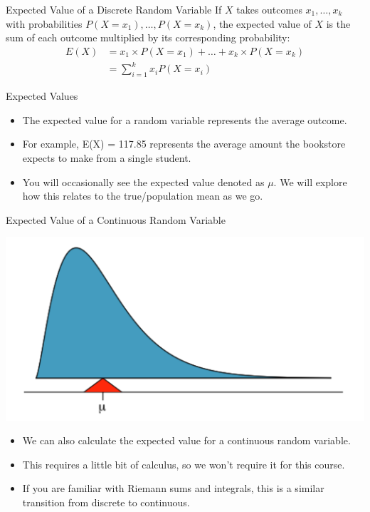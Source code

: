 \begin{frame}{Expected Value of a Discrete Random Variable}
    If $X$ takes outcomes $x_1, \dots, x_k$ with probabilities $P(X = x_1), \dots, P(X = x_k)$, the expected value of $X$ is the sum of each outcome multiplied by its corresponding probability:
    \begin{align*}
        E(X)&=x_1 \times P(X =x_1)+\dots +x_k ×P(X =x_k) \\
        &= \sum_{i=1}^k x_i P(X=x_i)
    \end{align*}
\end{frame}

\begin{frame}{Expected Values}
    \begin{itemize}
        \item The expected value for a random variable represents the average outcome. 
        \item For example, E(X) = 117.85 represents the average amount the bookstore expects to make from a single student.
        \item You will occasionally see the expected value denoted as $\mu$. We will explore how this relates to the true/population mean as we go.
    \end{itemize}
\end{frame}

\begin{frame}{Expected Value of a Continuous Random Variable}
    \begin{center}
        \includegraphics[scale=0.4]{images/contdist.png}
    \end{center}
    
    \vspace{-20pt}\begin{itemize}
        \item We can also calculate the expected value for a continuous random variable. 
        \item This requires a little bit of calculus, so we won't require it for this course.
        \item If you are familiar with Riemann sums and integrals, this is a similar transition from discrete to continuous.
    \end{itemize}
\end{frame}

